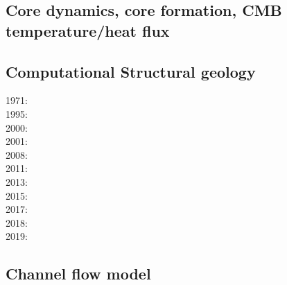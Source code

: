 \subsection{Core dynamics, core formation, CMB temperature/heat flux}

\noindent
{\scriptsize
\cite{hayu96}\cite{boeh96}
\cite{vayu98}
\cite{nata04c}
\cite{lahb08}\cite{gost08}\cite{sata08}
\cite{kisn09}
\cite{nata10}\cite{lamg10}\cite{sate10}
\cite{zhzh11}
\cite{cobu12}\cite{trbh12}
\cite{nata13}
\cite{lalt18}
\cite{yiym19}
}

\subsection{Computational Structural geology}

\noindent
{\scriptsize
1971: \cite{stbe71}\\
1995: \cite{fige95}\\
2000: \cite{acgf00}\cite{trla00}\\
2001: \cite{masc01}\\
2008: \cite{manc08}\cite{scsf08}\\
2011: \cite{frem11}\\
2013: \cite{soma13}\cite{lehl13}\\
2015: \cite{pevp15}\cite{jalr15}\\
2017: \cite{naam17}\cite{scdu17}\\
2018: \cite{naam18}\\
2019: \cite{llor19}\cite{yada19}\cite{sogh19}
}

\subsection{Channel flow model} 

